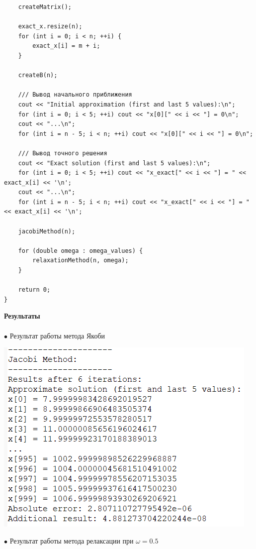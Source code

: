 \documentclass[a4paper, 12pt]{report}
\begin{document}
\begin{verbatim}
    createMatrix();

    exact_x.resize(n);
    for (int i = 0; i < n; ++i) {
        exact_x[i] = m + i;
    }

    createB(n);

    /// Вывод начального приближения
    cout << "Initial approximation (first and last 5 values):\n";
    for (int i = 0; i < 5; ++i) cout << "x[0][" << i << "] = 0\n";
    cout << "...\n";
    for (int i = n - 5; i < n; ++i) cout << "x[0][" << i << "] = 0\n";

    /// Вывод точного решения
    cout << "Exact solution (first and last 5 values):\n";
    for (int i = 0; i < 5; ++i) cout << "x_exact[" << i << "] = " << exact_x[i] << '\n';
    cout << "...\n";
    for (int i = n - 5; i < n; ++i) cout << "x_exact[" << i << "] = " << exact_x[i] << '\n';

    jacobiMethod(n);

    for (double omega : omega_values) {
        relaxationMethod(n, omega);
    }

    return 0;
}
   \end{verbatim}
   \newpage
   \textbf{\Huge{Результаты}}\\\\
   $\bullet$ Результат работы метода Якоби\\
   \begin{center}
        \includegraphics[scale = 0.7]{pic9.png}
   \end{center}
   $\bullet$ Результат работы метода релаксации при $\omega = 0.5$\\
\end{document}

